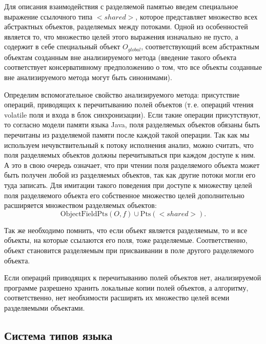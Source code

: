 \documentclass[14pt,titlepage]{extarticle}
\newcommand{\Pts}[1]{\textrm{Pts}(#1)}
\newcommand{\OFPts}[2]{\textrm{ObjectFieldPts}(#1, #2)}
\newcommand{\eng}[1]{{\English#1}}
\begin{document}
        Для описания взаимодействия с разделяемой памятью введем специальное
        выражение ссылочного типа ${<}shared{>}$, которое представляет
        множество всех абстрактных объектов, разделяемых между потоками. Одной
        из особенностей является то, что множество целей этого выражения
        изначально не пусто, а содержит в себе специальный объект
        $O_{global}$, соответствующий всем абстрактным объектам созданным
        вне анализируемого метода (введение такого объекта соответствует
        консервативному предположению о том, что все объекты созданные вне
        анализируемого метода могут быть синонимами).

        Определим вспомогательное свойство анализируемого метода: присутствие
        операций, приводящих к перечитыванию полей объектов (т.\,е. операций
        чтения \eng{volatile} поля и входа в блок синхронизации). Если такие
        операции присутствуют, то согласно модели памяти языка Java, поля
        разделяемых объектов обязаны быть перечитаны из разделяемой памяти
        после каждой такой операции. Так как мы используем нечувствительный к
        потоку исполнения анализ, можно считать, что поля разделяемых объектов
        должны перечитываться при каждом доступе к ним. А это в свою очередь
        означает, что при чтении поля разделяемого объекта может быть получен
        любой из разделяемых объектов, так как другие потоки могли его туда
        записать.
        Для имитации такого поведения при доступе к множеству целей поля
        разделяемого объекта его собственное множество целей дополнительно
        расширяется множеством разделяемых объектов:
        \[\OFPts{O}{f} \cup \Pts{{<}shared{>}}.\]

        Так же необходимо помнить, что если объект является разделяемым, то и
        все объекты, на которые ссылаются его поля, тоже разделяемые.
        Соответственно, объект становится разделяемым при присваивании в поле
        другого разделяемого объекта.

        Если операций приводящих к перечитыванию полей объектов нет,
        анализируемой программе разрешено хранить локальные копии полей
        объектов, а алгоритму, соответственно, нет необхимости расширять их
        множество целей всеми разделяемыми объектами.

    \subsection{Система типов языка}
      \label{section:type_system}
\end{document}
